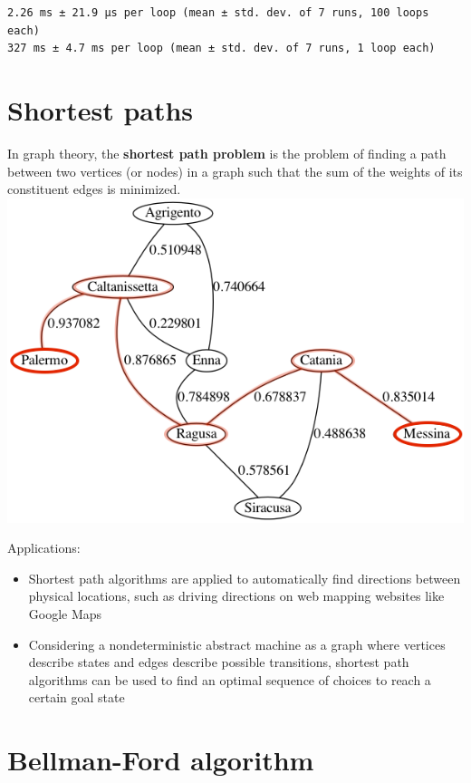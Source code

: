 \documentclass[11pt]{article}
\begin{document}
    \begin{Verbatim}[commandchars=\\\{\}]
2.26 ms ± 21.9 µs per loop (mean ± std. dev. of 7 runs, 100 loops each)
327 ms ± 4.7 ms per loop (mean ± std. dev. of 7 runs, 1 loop each)
    \end{Verbatim}

    \hypertarget{shortest-paths}{%
\section{Shortest paths}\label{shortest-paths}}

In graph theory, the \textbf{shortest path problem} is the problem of
finding a path between two vertices (or nodes) in a graph such that the
sum of the weights of its constituent edges is minimized.
\includegraphics{imgs/shortest_path.png}

    Applications: \begin{itemize}
\item Shortest path algorithms are applied to automatically
find directions between physical locations, such as driving directions
on web mapping websites like Google Maps 
\item Considering a nondeterministic abstract machine as a graph where vertices describe
states and edges describe possible transitions, shortest path algorithms
can be used to find an optimal sequence of choices to reach a certain
goal state
\end{itemize}

    \hypertarget{bellman-ford-algorithm}{%
\section{Bellman-Ford algorithm}\label{bellman-ford-algorithm}}
\end{document}
